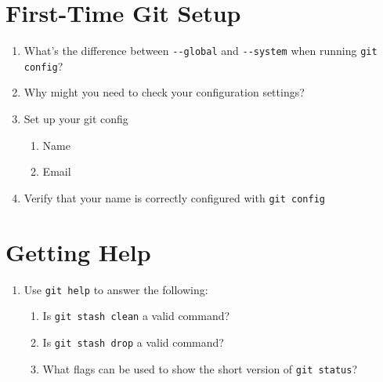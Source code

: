 \section{First-Time Git Setup}
\begin{enumerate}
    \item What's the difference between \verb+--global+ and \verb+--system+
        when running \verb+git config+?
    \item Why might you need to check your configuration settings?
    \item Set up your git config
        \begin{enumerate}
            \item Name
            \item Email
        \end{enumerate}
    \item Verify that your name is correctly configured with 
        \verb+git config+
\end{enumerate}

\section{Getting Help}
\begin{enumerate}
    \item Use \verb+git help+ to answer the following:
        \begin{enumerate}
            \item Is \verb+git stash clean+ a valid command?
            \item Is \verb+git stash drop+ a valid command?
            \item What flags can be used to show the short version of
                \verb+git status+?
        \end{enumerate}
\end{enumerate}
